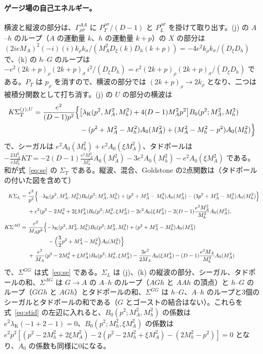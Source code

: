 \documentclass[a4paper,10pt]{ltjsarticle}
\newcommand{\lK}{\lambda_{\mathrm K}}
\begin{document}
\paragraph{ゲージ場の自己エネルギー。}横波と縦波の部分は、$\Gamma^{AA}_{\rho\sigma}$ に $P_T^{\rho\sigma}/(D-1)$ と $P_L^{\rho\sigma}$ を掛けて取り出す。(j) の $A$--$h$ のループ（$A$ の運動量 $k$、$h$ の運動量 $k+p$）の $X$ の部分は $(2ieM_A)^2(-i)(i)k_\rho k_\sigma/(M_A^2D_\xi(k)D_h(k+p))=-4e^2k_\rho k_\sigma/(D_\xi D_h)$ で、(k) の $h$--$G$ のループは $-e^2(2k+p)_\rho(2k+p)_\sigma\,i^2/(D_\xi D_h)=e^2(2k+p)_\rho(2k+p)_\sigma/(D_\xi D_h)$ である。$P_T$ は $p_\rho$ を消すので、横波の部分では $(2k+p)_\rho\to2k_\rho$ となり、二つは被積分関数として打ち消す。(j) の $U$ の部分の横波は
\begin{equation*}
\begin{aligned}
K\Sigma_T^{(j),U}=\frac{e^2}{(D-1)p^2}\Bigl\{&\bigl[\lK(p^2,M_A^2,M_h^2)+4(D-1)M_A^2p^2\bigr]B_0(p^2;M_A^2,M_h^2)\\
&-(p^2+M_A^2-M_h^2)A_0(M_A^2)+(M_A^2-M_h^2-p^2)A_0(M_h^2)\Bigr\}
\end{aligned}
\end{equation*}
で、シーガルは $e^2A_0(M_h^2)+e^2A_0(\xi M_A^2)$、タドポールは $-\frac{2M_A^2}{vM_h^2}KT=-2(D-1)\frac{e^2M_A^2}{M_h^2}A_0(M_A^2)-3e^2A_0(M_h^2)-e^2A_0(\xi M_A^2)$ である。和が式~\eqref{eq:se} の $\Sigma_T$ である。縦波、混合、Goldstone の2点関数は（タドポールの付いた図を含めて）
\begin{equation*}
\begin{aligned}
K\Sigma_L={}&\frac{e^2}{p^2}\Bigl\{-\lK(p^2,M_A^2,M_h^2)B_0(p^2;M_A^2,M_h^2)+(p^2+M_A^2-M_h^2)A_0(M_A^2)-(3p^2+M_A^2-M_h^2)A_0(M_h^2)\Bigr\}\\
&+e^2(p^2-2M_h^2+2\xi M_A^2)B_0(p^2;M_h^2,\xi M_A^2)-2e^2A_0(\xi M_A^2)-2(D-1)\frac{e^2M_A^2}{M_h^2}A_0(M_A^2),\\
K\Sigma^{AG}={}&\frac{e^2}{M_Ap^2}\Bigl\{-\lK(p^2,M_A^2,M_h^2)B_0(p^2;M_A^2,M_h^2)+(p^2+M_A^2-M_h^2)A_0(M_A^2)\\
&\hspace{3.6em}-\Bigl(\frac32p^2+M_A^2-M_h^2\Bigr)A_0(M_h^2)\Bigr\}\\
&+\frac{e^2}{M_A}(p^2-2M_h^2+\xi M_A^2)B_0(p^2;M_h^2,\xi M_A^2)-\frac{3e^2}{2M_A}A_0(\xi M_A^2)-(D-1)\frac{e^2M_A}{M_h^2}A_0(M_A^2)
\end{aligned}
\end{equation*}
で、$\Sigma^{GG}$ は式~\eqref{eq:se} である。$\Sigma_L$ は (j)、(k) の縦波の部分、シーガル、タドポールの和、$\Sigma^{AG}$ は $G\to A$ の $A$--$h$ のループ（$AGh$ と $AAh$ の頂点）と $h$--$G$ のループ（$GGh$ と $AGh$）とタドポールの和、$\Sigma^{GG}$ は $h$--$G$、$A$--$h$ のループと3個のシーガルとタドポールの和である（$G$ とゴーストの結合はない）。これらを式~\eqref{eq:stid} の左辺に入れると、$B_0(p^2;M_A^2,M_h^2)$ の係数は $e^2\lK(-1+2-1)=0$、$B_0(p^2;M_h^2,\xi M_A^2)$ の係数は $e^2p^2[(p^2-2M_h^2+2\xi M_A^2)-2(p^2-2M_h^2+\xi M_A^2)-(2M_h^2-p^2)]=0$ となり、$A_0$ の係数も同様に0になる。
\end{document}
